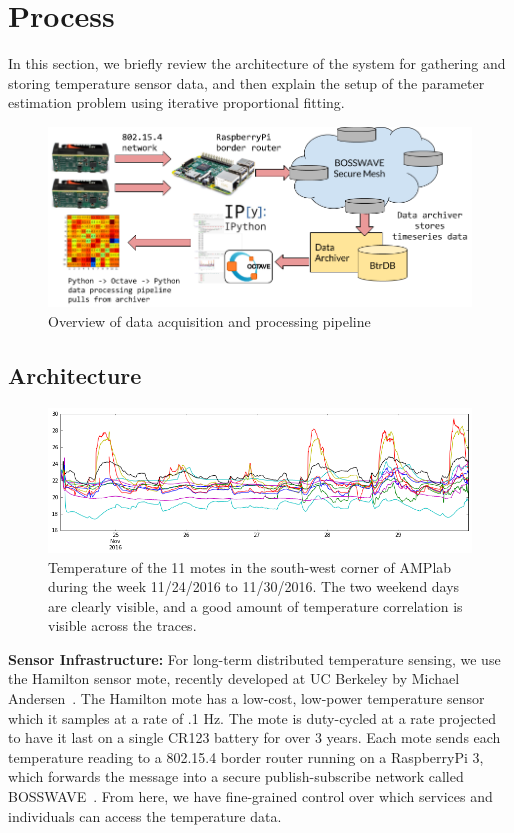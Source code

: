 \section{Process}

In this section, we briefly review the architecture of the system for gathering and storing temperature sensor data, and then explain the setup of the parameter estimation problem using iterative proportional fitting.

\begin{figure}[!hb]
\centering
\includegraphics[width=.8\linewidth]{figs/281arch}
\caption{Overview of data acquisition and processing pipeline}
\label{fig:architecture}
\end{figure}

\subsection{Architecture}


\begin{figure}[ht]
\centering
\includegraphics[width=.8\linewidth]{figs/temperatureplot}
\caption{Temperature of the 11 motes in the south-west corner of AMPlab during the week 11/24/2016 to 11/30/2016. The two weekend days are clearly visible, and a good amount of temperature correlation is visible across the traces.}
\label{fig:temperature}
\end{figure}

\textbf{Sensor Infrastructure:} For long-term distributed temperature sensing, we use the Hamilton sensor mote, recently developed at UC Berkeley by Michael Andersen~\cite{hamiltonmote}.
The Hamilton mote has a low-cost, low-power temperature sensor which it samples at a rate of .1 Hz. 
The mote is duty-cycled at a rate projected to have it last on a single CR123 battery for over 3 years.
Each mote sends each temperature reading to a 802.15.4 border router running on a RaspberryPi 3, which forwards the message into a secure publish-subscribe network called BOSSWAVE~\cite{andersen2016enabling}.
From here, we have fine-grained control over which services and individuals can access the temperature data.

